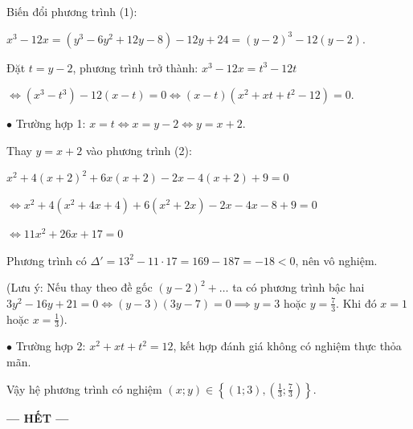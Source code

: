 \documentclass[12pt,a4paper]{article}
\begin{document}
Biến đổi phương trình (1):\par $x^3 - 12x = (y^3 - 6y^2 + 12y - 8) - 12y + 24 = (y - 2)^3 - 12(y - 2)$.\par Đặt $t = y - 2$, phương trình trở thành: $x^3 - 12x = t^3 - 12t$\par $\iff (x^3 - t^3) - 12(x - t) = 0 \iff (x - t)(x^2 + xt + t^2 - 12) = 0$.\par $\bullet$ Trường hợp 1: $x = t \iff x = y - 2 \iff y = x + 2$.\par Thay $y = x + 2$ vào phương trình (2):\par $x^2 + 4(x + 2)^2 + 6x(x + 2) - 2x - 4(x + 2) + 9 = 0$\par $\iff x^2 + 4(x^2 + 4x + 4) + 6(x^2 + 2x) - 2x - 4x - 8 + 9 = 0$\par $\iff 11x^2 + 26x + 17 = 0$\par Phương trình có $\Delta' = 13^2 - 11 \cdot 17 = 169 - 187 = -18 < 0$, nên vô nghiệm.\par (Lưu ý: Nếu thay theo đề gốc $(y - 2)^2 + \dots$ ta có phương trình bậc hai $3y^2 - 16y + 21 = 0 \iff (y - 3)(3y - 7) = 0 \implies y = 3$ hoặc $y = \frac{7}{3}$. Khi đó $x = 1$ hoặc $x = \frac{1}{3}$).\par $\bullet$ Trường hợp 2: $x^2 + xt + t^2 = 12$, kết hợp đánh giá không có nghiệm thực thỏa mãn.\par Vậy hệ phương trình có nghiệm $(x; y) \in \left\{(1; 3), \left(\frac{1}{3}; \frac{7}{3}\right)\right\}$.

\vspace{3mm}

\vfill
\begin{center}
  \textbf{--- HẾT ---}
\end{center}
\end{document}
